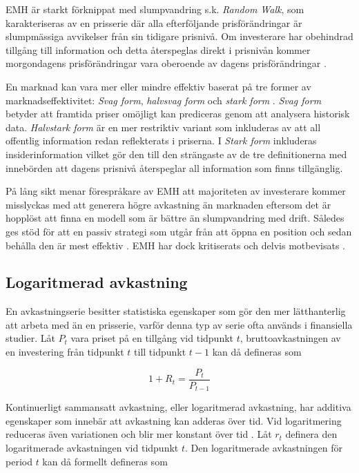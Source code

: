 \documentclass[11pt]{article}
\numberwithin{equation}{section}
\numberwithin{table}{section}
\numberwithin{figure}{section}
\begin{document}
EMH är starkt förknippat med slumpvandring s.k. \emph{Random Walk}, som karakteriseras av en prisserie där alla efterföljande prisförändringar är slumpmässiga avvikelser från sin tidigare prisnivå. Om investerare har obehindrad tillgång till information och detta återspeglas direkt i prisnivån kommer morgondagens prisförändringar vara oberoende av dagens prisförändringar \parencite{EMH}. 

En marknad kan vara mer eller mindre effektiv baserat på tre former av marknadseffektivitet: \emph{Svag form}, \emph{halvsvag form} och \emph{stark form} \parencite{Fama1970}. \emph{Svag form} betyder att framtida priser omöjligt kan prediceras genom att analysera historisk data. \emph{Halvstark form} är en mer restriktiv variant som inkluderas av att all offentlig information redan reflekterats i priserna. I \emph{Stark form} inkluderas insiderinformation vilket gör den till den strängaste av de tre definitionerna med innebörden att dagens prisnivå återspeglar all information som finns tillgänglig.

På lång sikt menar förespråkare av EMH att majoriteten av investerare kommer misslyckas med att generera högre avkastning än marknaden eftersom det är hopplöst att finna en modell som är bättre än slumpvandring med drift. Således ges stöd för att en passiv strategi som utgår från att öppna en position och sedan behålla den är mest effektiv \parencite{EMHforecast}. EMH har dock kritiserats och delvis motbevisats \parencite{basu1977investment, ball1978anomalies}.

\subsection{Logaritmerad avkastning}

En avkastningserie besitter statistiska egenskaper som gör den mer lätthanterlig att arbeta med än en prisserie, varför denna typ av serie ofta används i finansiella studier. Låt $P_{t}$ vara priset på en tillgång vid tidpunkt $t$, bruttoavkastningen av en investering från tidpunkt $t$ till tidpunkt $t-1$ kan då defineras som

\begin{equation}
    1+R_{t} = \frac{P_{t}}{P_{t-1}}
\end{equation}


Kontinuerligt sammansatt avkastning, eller logaritmerad avkastning, har additiva egenskaper som innebär att avkastning kan adderas över tid.  Vid logaritmering reduceras även variationen och blir mer konstant över tid \parencite{tsay}. Låt $r_{t}$ definera den logaritmerade avkastningen vid tidpunkt $t$. Den logaritmerade avkastningen för period $t$ kan då formellt defineras som
\end{document}
